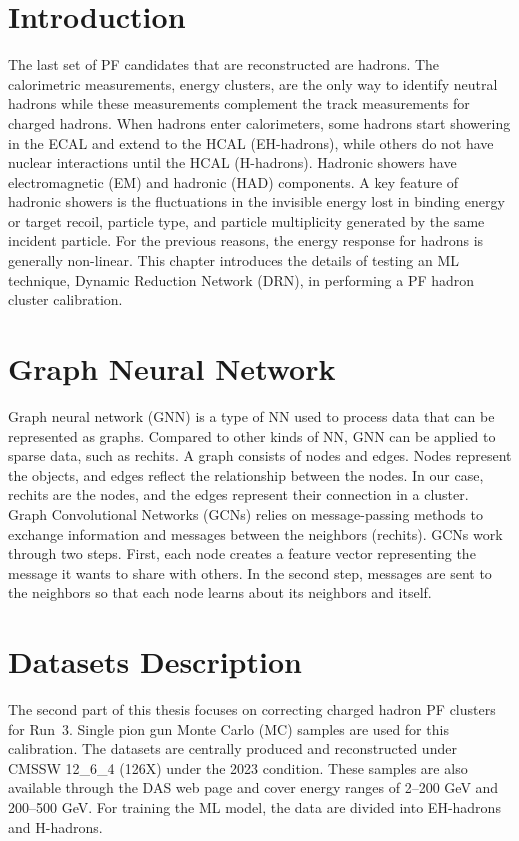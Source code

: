 \section{Introduction}
The last set of PF candidates that are reconstructed are hadrons. The calorimetric measurements, energy clusters, are the only way to identify neutral hadrons while these measurements complement the track measurements for charged hadrons. When hadrons enter calorimeters, some hadrons start showering in the ECAL and extend to the HCAL (EH-hadrons), while others do not have nuclear interactions until the HCAL (H-hadrons). Hadronic showers have electromagnetic (EM) and hadronic (HAD) components. A key feature of hadronic showers is the fluctuations in the invisible energy lost in binding energy or target recoil, particle type, and particle multiplicity generated by the same incident particle. %
For the previous reasons, the energy response for hadrons is generally non-linear.
This chapter introduces the details of testing an ML technique, Dynamic Reduction Network (DRN), in performing a PF hadron cluster calibration.


\section{Graph Neural Network} %
Graph neural network (GNN) is a type of NN used to process data that can be represented as graphs. Compared to other kinds of NN, GNN can be applied to sparse data, such as rechits. %
A graph consists of nodes and edges.
Nodes represent the objects, and edges reflect the relationship between the nodes.
In our case, rechits are the nodes, and the edges represent their connection in a cluster.
Graph Convolutional Networks (GCNs)%
relies on message-passing methods to exchange information and messages between the neighbors (rechits).
GCNs work through two steps. First, each node creates a feature vector representing the message it wants to share with others.
In the second step, messages are sent to the neighbors so that each node learns about its neighbors and itself.

\section{Datasets Description}
The second part of this thesis focuses on correcting charged hadron PF clusters for Run~3.
Single pion gun Monte Carlo (MC) samples are used for this calibration.
The datasets are centrally produced and reconstructed under CMSSW 12\_6\_4 (126X) under the 2023 condition.
These samples are also available through the DAS web page and cover energy ranges of 2--200 GeV and 200--500 GeV.
For training the ML model, the data are divided into EH-hadrons and H-hadrons. %

